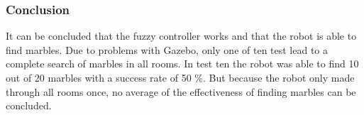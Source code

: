 \documentclass[../Head/Main.tex]{subfiles}
\begin{document}





\subsubsection*{Conclusion}

It can be concluded that the fuzzy controller works and that the robot is able to find marbles. Due to problems with Gazebo, only one of ten test lead to a complete search of marbles in all rooms. In test ten the robot was able to find 10 out of 20 marbles with a success rate of 50 \%. But because the robot only made through all rooms once, no average of the effectiveness of finding marbles can be concluded.     
\end{document}

